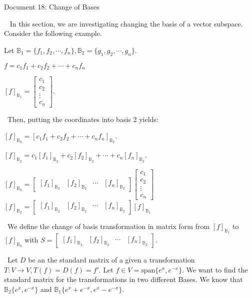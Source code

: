\documentclass[11 pt]{article}
\begin{document}
\begin{center}
Document 18: Change of Bases\\
\end{center}

\setlength{\leftskip}{0 in}
$\,\,\,$ In this section, we are investigating changing the basis of a vector subspace. Consider the following example.

\begin{center}
Let $\mathbb{B}_1=\lbrace f_1,f_2,\cdots,f_n\rbrace,\mathbb{B}_2=\lbrace g_1,g_2,\cdots,g_n\rbrace$.

$f=c_1f_1+c_2f_2+\cdots+c_nf_n$

$[f]_{\mathbb{B}_1}=\begin{bmatrix}c_1\\c_2\\\vdots\\c_n\end{bmatrix}$.
\end{center}

$\,\,\,$Then, putting the coordinates into basis 2 yields:
\begin{center}
$[f]_{\mathbb{B}_2}=[c_1f_1+c_2f_2+\cdots+c_nf_n]_{\mathbb{B}_2}$.

$[f]_{\mathbb{B}_2}=c_1[f_1]_{\mathbb{B}_2}+c_2[f_2]_{\mathbb{B}_2}+\cdots+c_n[f_n]_{\mathbb{B}_2}$.

$[f]_{\mathbb{B}_2}=\begin{bmatrix}[f_1]_{\mathbb{B}_2} & [f_2]_{\mathbb{B}_2} & \cdots & [f_n]_{\mathbb{B}_2}\end{bmatrix}\begin{bmatrix}c_1\\c_2\\\vdots\\c_n\end{bmatrix}$
$[f]_{\mathbb{B}_2}=\begin{bmatrix}[f_1]_{\mathbb{B}_2} & [f_2]_{\mathbb{B}_2} & \cdots & [f_n]_{\mathbb{B}_2}\end{bmatrix}[f]_{\mathbb{B}_1}$
\end{center}

$\,\,\,$We define the change of basis transformation in matrix form from $[f]_{\mathbb{B}_1}$ to $[f]_{\mathbb{B}_2}$ with $S=\begin{bmatrix}[f_1]_{\mathbb{B}_2} & [f_2]_{\mathbb{B}_2} & \cdots & [f_n]_{\mathbb{B}_2}\end{bmatrix}$.

$\,\,\,$Let $D$ be an the standard matrix of a given a transformation $T:V\rightarrow V,T(f)=D(f)=f\prime$. Let $f\in V=\text{span}\lbrace e^x,e^{-x}\rbrace$. We want to find the standard matrix for the transformations in two different Bases. We know that $\mathbb{B}_2\lbrace e^x,e^{-x}\rbrace$ and $\mathbb{B}_1\lbrace e^x+e^{-x},e^x-e^{-x}\rbrace$.\\
\end{document}
